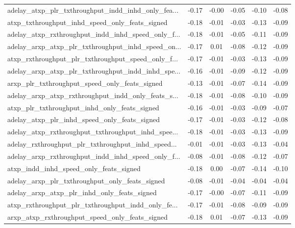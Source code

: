 \begin{tabular}{|l|*{4}{c}|r|}
adelay\_atxp\_plr\_txthroughput\_indd\_inhd\_only\_fea... & -0.17 & -0.00 &   -0.05 &      -0.10 & -0.08 \\
atxp\_txthroughput\_inhd\_speed\_only\_feats\_signed     & -0.18 & -0.01 &   -0.03 &      -0.13 & -0.09 \\
adelay\_atxp\_rxthroughput\_indd\_inhd\_speed\_only\_f... & -0.18 & -0.01 &   -0.05 &      -0.11 & -0.09 \\
adelay\_arxp\_atxp\_plr\_txthroughput\_inhd\_speed\_on... & -0.17 &  0.01 &   -0.08 &      -0.12 & -0.09 \\
atxp\_rxthroughput\_plr\_txthroughput\_speed\_only\_f... & -0.17 & -0.01 &   -0.03 &      -0.13 & -0.09 \\
adelay\_arxp\_atxp\_plr\_txthroughput\_indd\_inhd\_spe... & -0.16 & -0.01 &   -0.09 &      -0.12 & -0.09 \\
arxp\_plr\_txthroughput\_speed\_only\_feats\_signed      & -0.13 & -0.01 &   -0.07 &      -0.14 & -0.09 \\
adelay\_arxp\_atxp\_rxthroughput\_indd\_only\_feats\_s... & -0.18 & -0.01 &   -0.08 &      -0.10 & -0.09 \\
atxp\_plr\_txthroughput\_inhd\_only\_feats\_signed       & -0.16 & -0.01 &   -0.03 &      -0.09 & -0.07 \\
adelay\_atxp\_plr\_inhd\_speed\_only\_feats\_signed       & -0.17 & -0.01 &   -0.03 &      -0.12 & -0.08 \\
adelay\_atxp\_rxthroughput\_txthroughput\_inhd\_spee... & -0.18 & -0.01 &   -0.03 &      -0.13 & -0.09 \\
adelay\_rxthroughput\_plr\_txthroughput\_inhd\_speed... & -0.01 & -0.01 &   -0.03 &      -0.13 & -0.04 \\
adelay\_arxp\_rxthroughput\_indd\_inhd\_speed\_only\_f... & -0.08 & -0.01 &   -0.08 &      -0.12 & -0.07 \\
atxp\_indd\_inhd\_speed\_only\_feats\_signed             & -0.18 &  0.00 &   -0.07 &      -0.14 & -0.10 \\
adelay\_arxp\_plr\_txthroughput\_only\_feats\_signed     & -0.08 & -0.01 &   -0.04 &      -0.04 & -0.04 \\
adelay\_arxp\_atxp\_plr\_inhd\_only\_feats\_signed        & -0.17 & -0.00 &   -0.07 &      -0.11 & -0.09 \\
atxp\_rxthroughput\_plr\_txthroughput\_indd\_only\_fe... & -0.17 & -0.01 &   -0.08 &      -0.09 & -0.09 \\
arxp\_atxp\_rxthroughput\_speed\_only\_feats\_signed     & -0.18 &  0.01 &   -0.07 &      -0.13 & -0.09 \\

\end{tabular}
